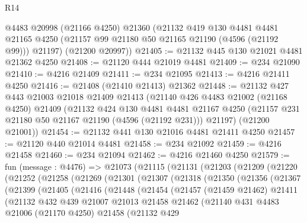 \begin{lexlean}{R14}
\begin{coremodule}
      @4483
      @20998
      (@21166 @4250)
      @21360
      (@21132
        @419
        @130
        @4481
        @4481
        @21165
        @4250
        (@21157 @99 @21180 @50 @21165 @21190 (@4596 (@21192 @99)))
        @21197)
      (@21200 @20997))
@21405 := @21132 @445 @130 @21021 @4481 @21362 @4250
@21408 := @21120 @444 @21019 @4481
@21409 := @234 @21090
@21410 := @4216 @21409
@21411 := @234 @21095
@21413 := @4216 @21411 @4250
@21416 := @21408 (@21410 @21413) @21362
@21448 := @21132
    @427
    @443
    @21003
    @21018
    @21409
    @21413
    (@21140
      @426
      @4483
      @21002
      (@21168 @4250)
      @21409
      (@21132
        @424
        @130
        @4481
        @4481
        @21167
        @4250
        (@21157 @231 @21180 @50 @21167 @21190 (@4596 (@21192 @231)))
        @21197)
      (@21200 @21001))
@21454 := @21132 @441 @130 @21016 @4481 @21411 @4250
@21457 := @21120 @440 @21014 @4481
@21458 := @234 @21092
@21459 := @4216 @21458
@21460 := @234 @21094
@21462 := @4216 @21460 @4250
@21579 := fun (message : @4476) =>
  @21073
    (@21115
      (@21131
        (@21203
          (@21209
            (@21220
              (@21252
                (@21258
                  (@21269
                    (@21301
                      (@21307
                        (@21318
                          (@21350
                            (@21356
                              (@21367
                                (@21399
                                  (@21405
                                    (@21416
                                      (@21448
                                        (@21454
                                          (@21457
                                            (@21459 @21462)
                                            @21411
                                            (@21132
                                              @432
                                              @439
                                              @21007
                                              @21013
                                              @21458
                                              @21462
                                              (@21140
                                                @431
                                                @4483
                                                @21006
                                                (@21170 @4250)
                                                @21458
                                                (@21132
                                                  @429

\end{coremodule}
\end{lexlean}
